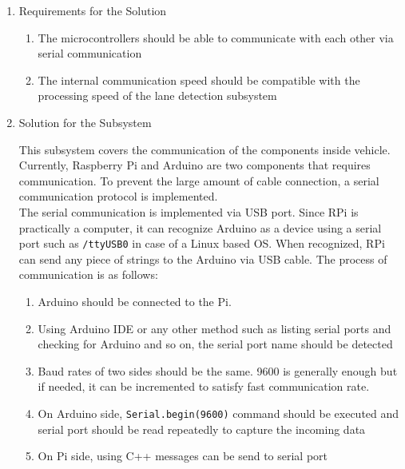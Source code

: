 \documentclass[a4paper,12pt]{article}
\begin{document}
			\begin{enumerate}
				\item {Requirements for the Solution}
				
				\begin{enumerate}
					\item The microcontrollers should be able to communicate with each other via serial communication
					\item The internal communication speed should be compatible with the processing speed of the lane detection subsystem  
				\end{enumerate}
			
				\item {Solution for the Subsystem}
				
				This subsystem covers the communication of the components inside vehicle. Currently, Raspberry Pi and Arduino are two components that requires communication. To prevent the large amount of cable connection, a serial communication protocol is implemented. \\
				
				The serial communication is implemented via USB port. Since RPi is practically a computer, it can recognize Arduino as a device using a serial port such as \lstinline|/ttyUSB0| in case of a Linux based OS. When recognized, RPi can send any piece of strings to the Arduino via USB cable. The process of communication is as follows:
	\begin{enumerate}
		\item Arduino should be connected to the Pi. \vspace{-0.2cm}
		\item Using Arduino IDE or any other method such as listing serial ports and checking for Arduino and so on, the serial port name should be detected \vspace{-0.2cm}
		\item Baud rates of two sides should be the same. 9600 is generally enough but if needed, it can be incremented to satisfy fast communication rate. \vspace{-0.2cm}
		\item On Arduino side, \texttt{Serial.begin(9600)} command should be executed and serial port should be read repeatedly to capture the incoming data \vspace{-0.2cm}
		\item On Pi side, using  C++ messages can be send to serial port
	\end{enumerate}
	

\end{enumerate}
\end{document}
